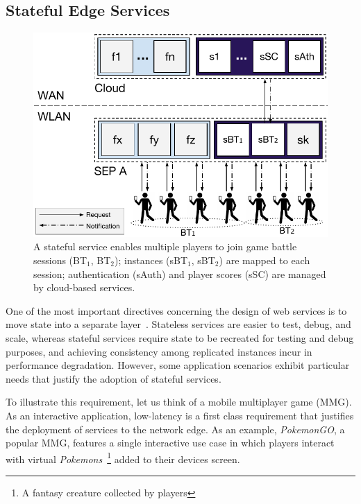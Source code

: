 \subsection{Stateful Edge Services}


\begin{figure}[tbp]
	\centering
	\includegraphics[width=\linewidth]{Figs/Stateful_Edge_Services.pdf}
	\caption{A stateful service enables multiple players to join game battle sessions (BT$_1$, BT$_2$); instances (sBT$_1$, sBT$_2$) are mapped to each session; authentication (sAuth) and player scores (sSC) are managed by cloud-based services.}
	\label{fig:Steteful_Edge_MMG}
\end{figure}

One of the most important directives concerning the design of web services is to move state into a separate layer~\cite{Armbrust:2010}. Stateless services are easier to test, debug, and scale, whereas stateful services require state to be recreated for testing and debug purposes, and achieving consistency among replicated instances incur in performance degradation. However, some application scenarios exhibit particular needs that justify the adoption of stateful services.


To illustrate this requirement, let us think of a mobile multiplayer game (MMG). As an interactive application, low-latency is a first class requirement that justifies the deployment of services to the network edge. As an example, \textit{PokemonGO}, a popular MMG, features a single interactive use case in which players interact with virtual \textit{Pokemons}~\footnote{A fantasy creature collected by players} added to their devices screen. 
%


